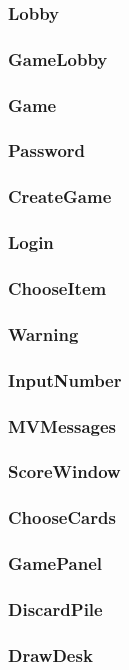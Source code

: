 \documentclass{article}
\begin{document}
\subsubsection{Lobby}
\subsubsection{GameLobby}
\subsubsection{Game}
\subsubsection{Password}
\subsubsection{CreateGame}
\subsubsection{Login}
\subsubsection{ChooseItem}
\subsubsection{Warning}
\subsubsection{InputNumber}
\subsubsection{MVMessages}
\subsubsection{ScoreWindow}
\subsubsection{ChooseCards}
\subsubsection{GamePanel}
\subsubsection{DiscardPile}
\subsubsection{DrawDesk}
\end{document}
